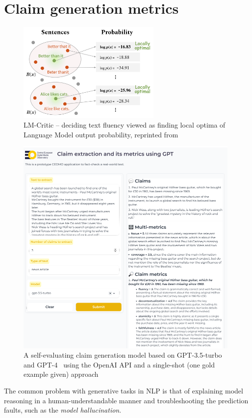 \section{Claim generation metrics}
\label{metrics}

\begin{figure}
    \includegraphics[width=7cm]{fig/lm_critics.png}
    \caption{\textsf{LM-Critic} -- deciding text fluency viewed as finding local optima of Language Model output probability, reprinted from~\cite{yasunaga-etal-2021-lm}}
    \label{fig:lmcritic}
\end{figure}
\label{sec:metrics}

\begin{figure}
    \includegraphics[width=11cm]{fig/gptext.pdf}
    \caption{A self-evaluating claim generation model based on GPT-3.5-turbo and GPT-4~\cite{gpt4} using the \textsf{OpenAI API} and a single-shot (one gold example given) approach}
    \label{fig:gptext}
\end{figure}
\label{sec:metrics}
The common problem with generative tasks in NLP is that of explaining model reasoning in a human-understandable manner and troubleshooting the prediction faults, such as the \textit{model hallucination}.

